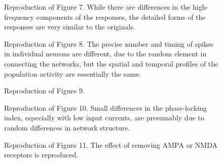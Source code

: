 \begin{figure}
    \begin{minipage}{0.48\textwidth}
        \caption{Reproduction of Figure 7. While there are differences in the high-frequency components of the responses,
        the detailed forms of the responses are very similar to the originals.}
    \end{minipage}\hfill
    \begin{minipage}{0.48\textwidth}
        \caption{Reproduction of Figure 8.
                 The precise number and timing of spikes in individual neurons are different,
                 due to the random element in connecting the networks,
                 but the spatial and temporal profiles of the population activity are essentially the same.}
    \end{minipage}
\end{figure}

\begin{figure}
\centering
{}
\caption{Reproduction of Figure 9.}
\end{figure}

\begin{figure}
    \begin{minipage}{0.48\textwidth}
        \caption{Reproduction of Figure 10.
        Small differences in the phase-locking index, especially with low input currents,
        are presumably due to random differences in network structure.}
    \end{minipage}\hfill
    \begin{minipage}{0.48\textwidth}
        \caption{Reproduction of Figure 11. The effect of removing AMPA or NMDA receptors is reproduced.}
    \end{minipage}
\end{figure}

